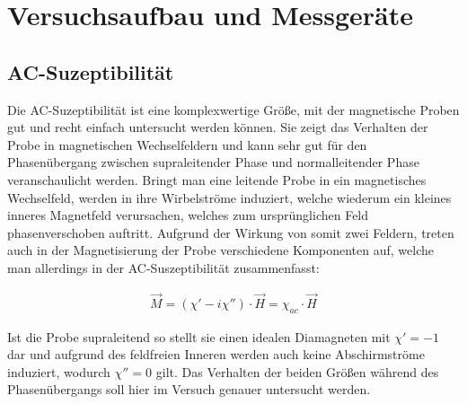 \section{Versuchsaufbau und Messgeräte}
\subsection{AC-Suzeptibilität}
Die AC-Suzeptibilität ist eine komplexwertige Größe, mit der magnetische Proben gut und recht einfach untersucht werden können. Sie zeigt das Verhalten der Probe in magnetischen Wechselfeldern und kann sehr gut für den Phasenübergang zwischen supraleitender Phase und normalleitender Phase veranschaulicht werden. Bringt man eine leitende Probe in ein magnetisches Wechselfeld, werden in ihre Wirbelströme induziert, welche wiederum ein kleines inneres Magnetfeld verursachen, welches zum ursprünglichen Feld phasenverschoben auftritt. Aufgrund der Wirkung von somit zwei Feldern, treten auch in der Magnetisierung der Probe verschiedene Komponenten auf, welche man allerdings in der AC-Suszeptibilität zusammenfasst:

\begin{align}
\overrightarrow{M}=\left(\chi' - i\chi ''\right)\cdot \overrightarrow{H}=\chi_{ac} \cdot \overrightarrow{H}
\end{align}

Ist die Probe supraleitend so stellt sie einen idealen Diamagneten mit $\chi'=-1$ dar und aufgrund des feldfreien Inneren werden auch keine Abschirmströme induziert, wodurch $\chi'' =0$ gilt. Das Verhalten der beiden Größen während des Phasenübergangs soll hier im Versuch genauer untersucht werden.

